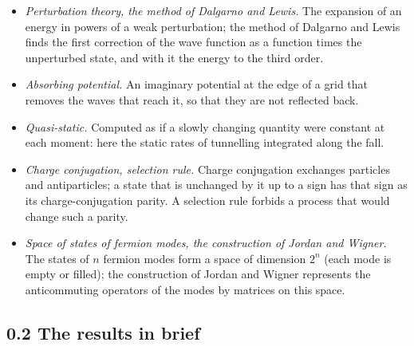 \documentclass[
  10pt,
]{article}
\begin{document}
\begin{itemize}
  matrix elements.
\item
  \emph{Perturbation theory, the method of Dalgarno and Lewis.} The
  expansion of an energy in powers of a weak perturbation; the method of
  Dalgarno and Lewis finds the first correction of the wave function as
  a function times the unperturbed state, and with it the energy to the
  third order.
\item
  \emph{Absorbing potential.} An imaginary potential at the edge of a
  grid that removes the waves that reach it, so that they are not
  reflected back.
\item
  \emph{Quasi-static.} Computed as if a slowly changing quantity were
  constant at each moment: here the static rates of tunnelling
  integrated along the fall.
\item
  \emph{Charge conjugation, selection rule.} Charge conjugation
  exchanges particles and antiparticles; a state that is unchanged by it
  up to a sign has that sign as its charge-conjugation parity. A
  selection rule forbids a process that would change such a parity.
\item
  \emph{Space of states of fermion modes, the construction of Jordan and
  Wigner.} The states of \(n\) fermion modes form a space of dimension
  \(2^n\) (each mode is empty or filled); the construction of Jordan and
  Wigner represents the anticommuting operators of the modes by matrices
  on this space.
\end{itemize}

\hypertarget{the-results-in-brief}{%
\subsection{0.2 The results in brief}\label{the-results-in-brief}}
\end{document}
